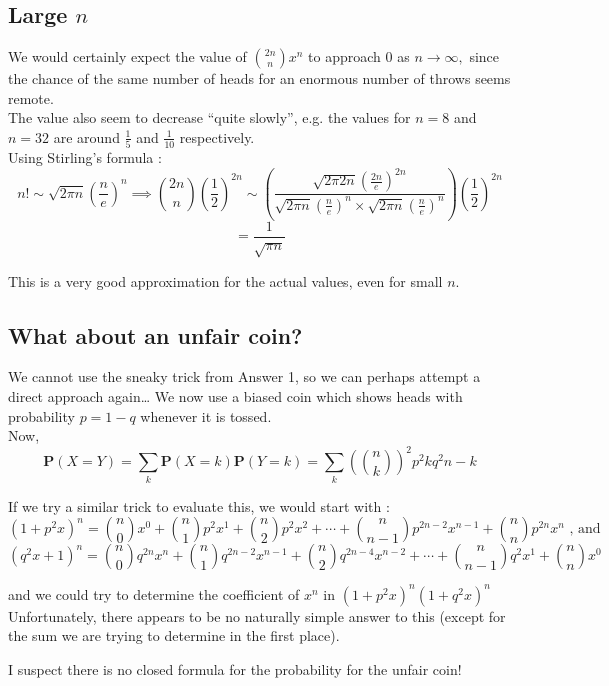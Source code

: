 \subsection{Large $n$}
We would certainly expect the value of $\binom{2n}{n} x^n$ to approach $0$ as $n \rightarrow \infty,$ since the chance of the same number of heads for an enormous number of throws seems remote. \\
The value also seem to decrease ``quite slowly'', e.g. the values for $n=8$ and $n=32$ are around $\frac{1}{5}$ and $\frac{1}{10}$ respectively. \\
Using Stirling's formula :     
\begin{equation*}
n!  \sim \sqrt{2 \pi n}(\frac{n}{e})^n \implies \binom{2n}{n}\left(\frac{1}{2}\right)^{2n} \sim \left(\frac{\sqrt{2 \pi 2n}(\frac{2n}{e})^{2n}}{\sqrt{2 \pi n}(\frac{n}{e})^n \times \sqrt{2 \pi n}(\frac{n}{e})^n}\right)\left(\frac{1}{2}\right)^{2n}
\end{equation*}
\begin{equation*}
= \frac{1}{\sqrt{\pi n}}
\end{equation*}

This is a very good approximation for the actual values, even for small $n$.

\subsection{What about an unfair coin?}
 
We cannot use the sneaky trick from Answer 1, so we can perhaps attempt a direct approach again\ldots
We now use a biased coin which shows heads with probability $p = 1 - q$ whenever it is tossed. \\

Now,
\begin{equation*}
\mathbf{P}(X = Y) = \sum_k \mathbf{P}(X = k)\mathbf{P}(Y = k) = 
 \sum_k \left(\binom{n}{k}\right)^2 p^2k q^2{n-k} 
\end{equation*}

If we try a similar trick to evaluate this, we would start with : 
\begin{equation*}
(1 +p^2 x)^n = \binom{n}{0}x^0 + \binom{n}{1}p^2x^1 + \binom{n}{2}p^2x^2 + \cdots + \binom{n}{n-1}p^{2n-2}x^{n-1} + \binom{n}{n}p^{2n}x^n  \text{ , and}   
\end{equation*}
\begin{equation*}
(q^2x + 1)^n = \binom{n}{0}q^{2n}x^n + \binom{n}{1}q^{2n-2}x^{n-1} + \binom{n}{2}q^{2n-4}x^{n-2} + \cdots + \binom{n}{n-1}q^2x^1 + \binom{n}{n}x^0   
\end{equation*}

and we could try to determine the coefficient of $x^n$ in $(1+p^2x)^n (1+q^2x)^n$ \\
Unfortunately, there appears to be no naturally simple answer to this (except for the sum we are trying to determine in the first place).

I suspect there is no closed formula for the probability for the unfair coin! 
